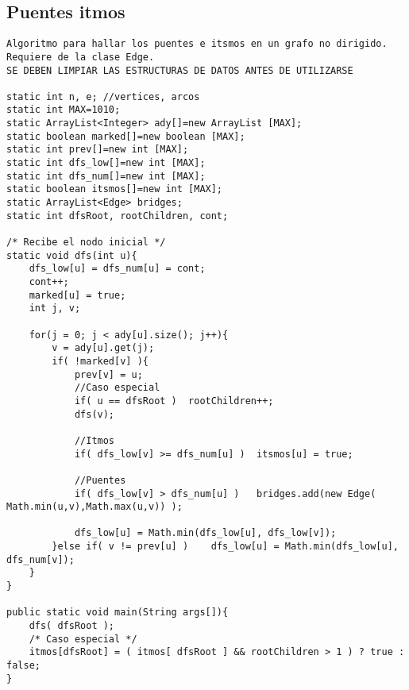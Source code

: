 \documentclass[10pt,letterpaper,twocolumn,twosided]{article}
\begin{document}
\subsection{Puentes itmos}
\begin{lstlisting}
Algoritmo para hallar los puentes e itsmos en un grafo no dirigido. Requiere de la clase Edge.
SE DEBEN LIMPIAR LAS ESTRUCTURAS DE DATOS ANTES DE UTILIZARSE

static int n, e; //vertices, arcos
static int MAX=1010;     
static ArrayList<Integer> ady[]=new ArrayList [MAX];
static boolean marked[]=new boolean [MAX];
static int prev[]=new int [MAX];
static int dfs_low[]=new int [MAX];
static int dfs_num[]=new int [MAX];
static boolean itsmos[]=new int [MAX];
static ArrayList<Edge> bridges;
static int dfsRoot, rootChildren, cont;

/* Recibe el nodo inicial */
static void dfs(int u){
    dfs_low[u] = dfs_num[u] = cont;
    cont++;
    marked[u] = true;
    int j, v;

    for(j = 0; j < ady[u].size(); j++){
        v = ady[u].get(j);
        if( !marked[v] ){
            prev[v] = u;
            //Caso especial 
            if( u == dfsRoot )  rootChildren++;
            dfs(v);

            //Itmos
            if( dfs_low[v] >= dfs_num[u] )  itsmos[u] = true;
            
            //Puentes
            if( dfs_low[v] > dfs_num[u] )   bridges.add(new Edge( Math.min(u,v),Math.max(u,v)) );
            
            dfs_low[u] = Math.min(dfs_low[u], dfs_low[v]);
        }else if( v != prev[u] )    dfs_low[u] = Math.min(dfs_low[u], dfs_num[v]);
    }
}

public static void main(String args[]){
    dfs( dfsRoot );
    /* Caso especial */
    itmos[dfsRoot] = ( itmos[ dfsRoot ] && rootChildren > 1 ) ? true : false;
}

\end{lstlisting}
\end{document}
